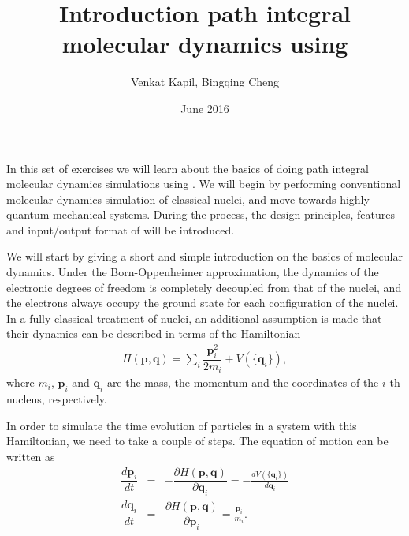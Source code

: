 \documentclass{article}
\title{Introduction path integral \\molecular dynamics using \ipi{}}
\author{Venkat Kapil, Bingqing Cheng}
\date{June 2016}
\begin{document}
\maketitle

In this set of exercises we will learn 
about the basics of doing path integral 
molecular dynamics simulations using \ipi{}. 
We will begin by performing conventional
molecular dynamics simulation of classical nuclei,
and move towards highly quantum mechanical systems.
During the process, the design principles, 
features and input/output format of \ipi{} 
will be introduced.

\begin{Exercise}[label={basic},title={Molecular Dynamics simulations doing in a different way:  server and clients}]

We will start by giving a short and simple introduction on the basics of molecular dynamics.
Under the Born-Oppenheimer
approximation, the dynamics of the electronic
degrees of freedom is completely decoupled from that of the nuclei, and the electrons always
occupy the ground state for each configuration of the nuclei. 
In a fully classical treatment of nuclei, an
additional assumption is made that their 
dynamics can be described in terms of the 
Hamiltonian
\begin{eqnarray}
    H(\textbf{p},\textbf{q})=\sum_i \dfrac{\textbf{p}_i^2}{2 m_i} + V(\{\textbf{q}_i\}),
\end{eqnarray}
where $m_i$, $\textbf{p}_i$ and $\textbf{q}_i$ 
are the mass, the momentum and the coordinates of the $i$-th nucleus, respectively.

In order to simulate the time evolution of particles in a system
with this Hamiltonian, we need to take a couple of steps.
The equation of motion can be written as
\begin{eqnarray}
   \dfrac{d \textbf{p}_i}{d t}&=& 
   - \dfrac{\partial H(\textbf{p},\textbf{q})}{\partial \textbf{q}_i}=-\frac{d V(\{\textbf{q}_i\})}{d\textbf{q}_i} \\
   \dfrac{d \textbf{q}_i}{d t}&=& 
   \dfrac{\partial H(\textbf{p},\textbf{q})}{\partial \textbf{p}_i} = \frac{\textbf{p}_i}{m_i}.
\end{eqnarray}


\end{Exercise}
\end{document}
